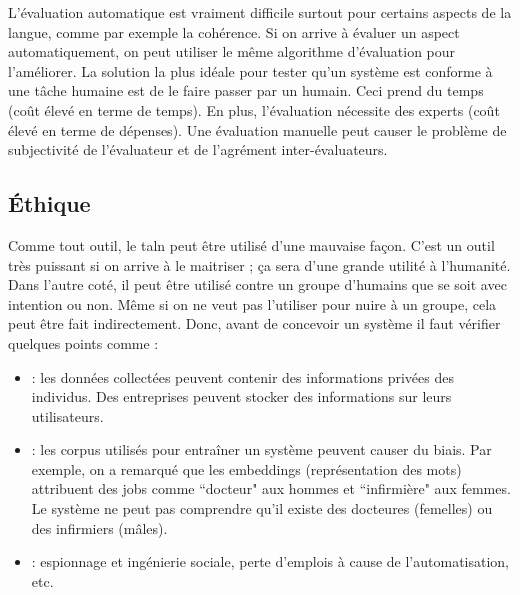 \documentclass{KodeBook}
\begin{document}
L'évaluation automatique est vraiment difficile surtout pour certains aspects de la langue, comme par exemple la cohérence. 
Si on arrive à évaluer un aspect automatiquement, on peut utiliser le même algorithme d'évaluation pour l'améliorer. 
La solution la plus idéale pour tester qu'un système est conforme à une tâche humaine est de le faire passer par un humain.
Ceci prend du temps (coût élevé en terme de temps). 
En plus, l'évaluation nécessite des experts (coût élevé en terme de dépenses).
Une évaluation manuelle peut causer le problème de subjectivité de l'évaluateur et de l'agrément inter-évaluateurs.

\subsection{Éthique}

Comme tout outil, le \ac{taln} peut être utilisé d'une mauvaise façon. 
C'est un outil très puissant si on arrive à le maitriser ; ça sera d'une grande utilité à l'humanité. 
Dans l'autre coté, il peut être utilisé contre un groupe d'humains que se soit avec intention ou non. 
Même si on ne veut pas l'utiliser pour nuire à un groupe, cela peut être fait indirectement. 
Donc, avant de concevoir un système il faut vérifier quelques points comme :
\begin{itemize}
	\item {} : les données collectées peuvent contenir des informations privées des individus. Des entreprises peuvent stocker des informations sur leurs utilisateurs. 
	\item {} : les corpus utilisés pour entraîner un système peuvent causer du biais.
	Par exemple, on a remarqué que les embeddings (représentation des mots) attribuent des jobs comme ``docteur" aux hommes et ``infirmière" aux femmes. 
	Le système ne peut pas comprendre qu'il existe des docteures (femelles) ou des infirmiers (mâles).
	\item {} : espionnage et ingénierie sociale, perte d'emplois à cause de l'automatisation, etc.
\end{itemize}
\end{document}

